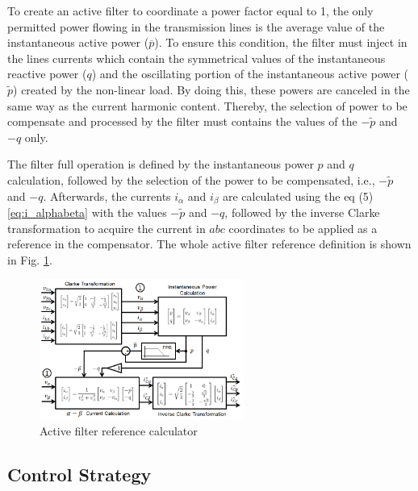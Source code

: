 To create an active filter to coordinate a power factor equal to 1, the only permitted power flowing in the transmission lines is the average value of the instantaneous active power ($\overline{p}$). To ensure this condition, the filter must inject in the lines currents which contain the symmetrical values of the instantaneous reactive power ($q$) and the oscillating portion of the instantaneous active power ($\tilde{p}$) created by the non-linear load. By doing this, these powers are canceled in the same way as the current harmonic content. Thereby, the selection of power to be compensate and processed by the filter must contains the values of the $-\tilde{p}$ and $-q$ only.

The filter full operation is defined by the instantaneous power $p$ and $q$ calculation, followed by the selection of the power to be compensated, i.e., $-\tilde{p}$ and $-q$. Afterwards, the currents $i_{\alpha}$ and $i_{\beta}$ are calculated using the eq (5) \ref{eq:i_alphabeta} with the values $-\tilde{p}$ and $-q$, followed by the inverse Clarke transformation to acquire the current in $abc$ coordinates to be applied as a reference in the compensator. The whole active filter reference definition is shown in Fig. \ref{fig:diagrama_filtro.png}.


\begin{figure}[!th]
	\centering
	\includegraphics[width=0.6\textwidth]{Figures/diagrama_filtro.png}
	\caption{Active filter reference calculator}
	\label{fig:diagrama_filtro.png}
\end{figure}


\subsection{Control Strategy}

